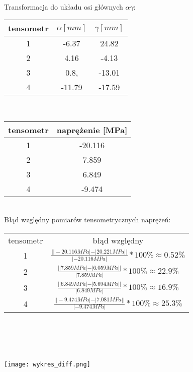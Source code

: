 \documentclass[11pt]{article}
\begin{document}
\\
Transformacja do układu osi głównych $\alpha\gamma$:\\
\begin{tabular}{c|c|c}
tensometr & $\alpha[mm]$ & $\gamma[mm]$\\ \hline
1 & -6.37 & 24.82\\
2 & 4.16 & -4.13\\
3 & 0.8, & -13.01\\
4 & -11.79 & -17.59\\
\end{tabular}
\\
\begin{tabular}{c|c}
tensometr & naprężenie [MPa]\\ \hline
1 & -20.116\\
2 & 7.859\\
3 & 6.849\\
4 & -9.474\\
\end{tabular}
\\
Błąd względny pomiarów tensometrycznych naprężeń:\\
\begin{tabular}{cc}
tensometr & błąd względny\\
1 & $\frac{||-20.116 MPa|-|20.221 MPa||}{|-20.116 MPa|} * 100\% \approx 0.52\%$\\
2 & $\frac{||7.859 MPa|-|6.059 MPa||}{|7.859 MPa|} * 100\% \approx 22.9\%$\\
3 & $\frac{||6.849 MPa|-|5.694 MPa||}{|6.849 MPa|} * 100\% \approx 16.9\%$\\
4 & $\frac{||-9.474 MPa|-|7.081 MPa||}{|-9.474 MPa|} * 100\% \approx 25.3\%$\\
\end{tabular}\\
\\\\\\
\texttt{[image: wykres\_diff.png]}
\end{document}
